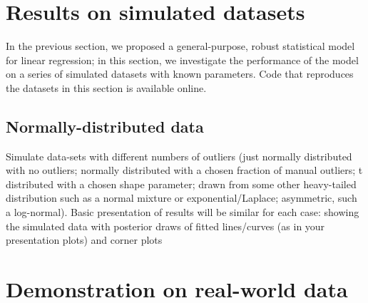 \documentclass[fleqn,usenatbib]{mnras}
\begin{document}





\section{Results on simulated datasets}
\label{sec:results}

In the previous section, we proposed a general-purpose, robust statistical model
for linear regression; in this section, we investigate the performance of the
model on a series of simulated datasets with known parameters. Code that
reproduces the datasets in this section is available online\footnotemark.


\subsection{Normally-distributed data}

Simulate data-sets with different numbers of outliers (just normally distributed
with no outliers; normally distributed with a chosen fraction of manual
outliers; t distributed with a chosen shape parameter; drawn from some other
heavy-tailed distribution such as a normal mixture or exponential/Laplace;
asymmetric, such a log-normal).  Basic presentation of results will be similar
for each case: showing the simulated data with posterior draws of fitted
lines/curves (as in your presentation plots) and corner plots

\section{Demonstration on real-world data}
\label{sec:real-world}
\end{document}
